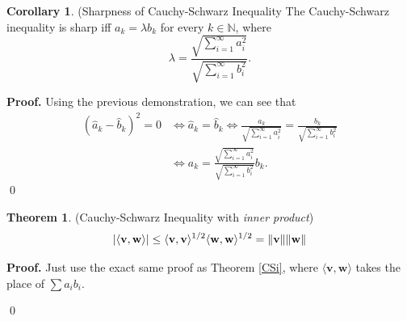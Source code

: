 \documentclass[11pt]{article}
\theoremstyle{definition}
\newenvironment{prf}[1][Proof]{\textbf{#1.} }{\qed}
\newtheorem{theorem}{Theorem}[section]
\newtheorem{corollary}{Corollary}[section]
\DeclarePairedDelimiter{\norm}{\lVert}{\rVert}
\begin{document}
\begin{corollary}{(Sharpness of Cauchy-Schwarz Inequality}
    The Cauchy-Schwarz inequality is sharp iff
    $a_k = \lambda b_k$ for every $k \in \mathbb N$, where
    \begin{equation}
        \lambda = \frac{\sqrt{\sum^\infty_{i=1}a_i ^2}}
        {\sqrt{\sum^\infty_{i=1}b_i ^2}}.
    \end{equation}
\end{corollary}
\begin{shaded}
\begin{prf}
    Using the previous demonstration, we can see that
    \begin{align*}
        (\hat a_k - \hat b_k)^2 = 0 &\iff \hat a_k = \hat b_k \iff
        \frac{a_k}{\sqrt{\sum^\infty_{i=1} a_i^2}}=
        \frac{b_k}{\sqrt{\sum^\infty_{i=1} b_i^2}}\\
        &\iff
        a_k = \frac{\sqrt{\sum^\infty_{i=1}a_i^2}}
        {\sqrt{\sum^\infty_{i=1}b_i^2}} b_k.
    \end{align*}
\end{prf}
\end{shaded}

\newpage
\begin{theorem}{(Cauchy-Schwarz Inequality with \textit{inner product})}
   \begin{equation}
    |\langle \mathbf v, \mathbf w \rangle| \leq
    \langle \mathbf v, \mathbf v \rangle^{1/2}
    \langle \mathbf w, \mathbf w \rangle^{1/2} =
    \norm{\mathbf v}
    \norm{\mathbf w}
   \end{equation}
\end{theorem}
\begin{shaded}
    \begin{prf}
        Just use the exact same proof as Theorem \ref{CSi}, where
        $\langle \mathbf v, \mathbf w \rangle$ takes the place of $\sum a_i b_i$.

    \end{prf}
\end{shaded}
\end{document}
